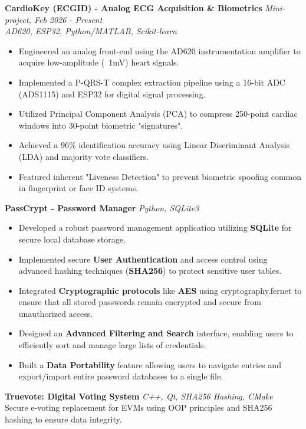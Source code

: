 \documentclass[a4paper]{article}
\begin{document}
\textbf{CardioKey (ECGID) - Analog ECG Acquisition \& Biometrics} \hfill \textit{Mini-project, Feb 2026 - Present}\\
{\sl AD620, ESP32, Python/MATLAB, Scikit-learn}
\begin{itemize} \itemsep 1pt
    \item Engineered an analog front-end using the AD620 instrumentation amplifier to acquire low-amplitude (~1mV) heart signals.
    \item Implemented a P-QRS-T complex extraction pipeline using a 16-bit ADC (ADS1115) and ESP32 for digital signal processing.
    \item Utilized Principal Component Analysis (PCA) to compress 250-point cardiac windows into 30-point biometric "signatures".
    \item Achieved a 96\% identification accuracy using Linear Discriminant Analysis (LDA) and majority vote classifiers.
    \item Featured inherent "Liveness Detection" to prevent biometric spoofing common in fingerprint or face ID systems.
\end{itemize}
\vspace*{2mm}

\textbf{PassCrypt - Password Manager} \hfill {\sl Python, SQLite3} \\
\begin{itemize}
    \item Developed a robust password management application utilizing \textbf{SQLite} for secure local database storage.
    \item Implemented secure \textbf{User Authentication} and access control using advanced hashing techniques (\textbf{SHA256}) to protect sensitive user tables.
    \item Integrated \textbf{Cryptographic protocols} like \textbf{AES} using cryptography.fernet to ensure that all stored passwords remain encrypted and secure from unauthorized access.
    \item Designed an \textbf{Advanced Filtering and Search} interface, enabling users to efficiently sort and manage large lists of credentials.
    \item Built a \textbf{Data Portability} feature allowing users to navigate entries and export/import entire password databases to a single file.
\end{itemize}
\vspace*{2mm}

\textbf{Truevote: Digital Voting System} \hfill {\sl C++, Qt, SHA256 Hashing, CMake} \\
Secure e-voting replacement for EVMs using OOP principles and SHA256 hashing to ensure data integrity.\\
\vspace*{7mm}
\end{document}
